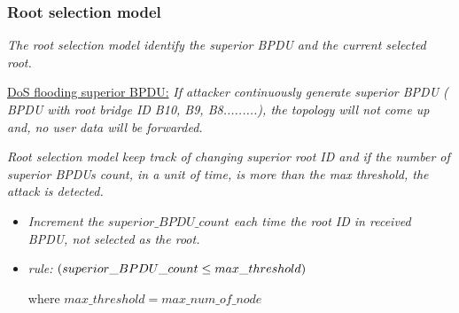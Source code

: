 \documentclass[10pt, blue,subsection=true, compress]{beamer}
\begin{document}



\begin{frame} \frametitle{Root selection model }
\emph{The root selection model identify the superior BPDU and the current selected root.} 

\vspace{ 1 mm}
\pause
\underline{DoS flooding superior BPDU:}
\emph{If attacker continuously generate superior BPDU \textit{( BPDU with root bridge ID B10, B9, B8.........)}, the topology will not come up and, no user data will be forwarded.}
\begin{center}
\begin{block}{}
\emph{\color{blue} {Root selection model keep track of changing superior root ID and if the number of superior BPDUs count, in a unit of time, is more than the\textit{ max threshold}, the attack is detected. }}\newline

\begin{itemize}
\item
\emph{Increment the \begin{math} superior\_BPDU\_count \end{math} each time the root ID in received BPDU, not selected as the root.  } \\

\item \textit{rule:} 
\begin{math} 
(superior\_BPDU\_count \leq max\_threshold )\newline
\end{math}

 where \begin{math} max\_threshold = max\_num\_of\_node \end{math}
\end{itemize}
\end{block}
\end{center}
\end{frame} 
\end{document}
